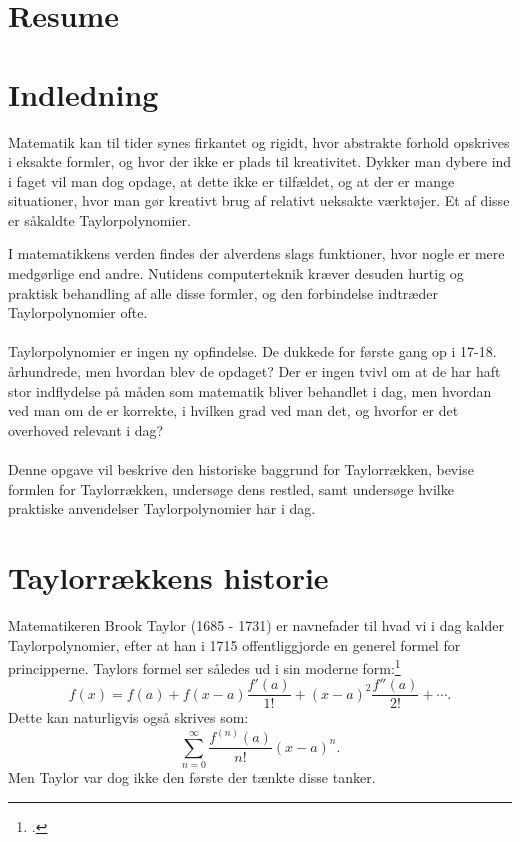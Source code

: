 \documentclass[12pt, a4paper]{article}
\begin{document}
\section*{Resume} %
\blindtext[1-2]
\tableofcontents
\newpage



\section{Indledning} %
Matematik kan til tider synes firkantet og rigidt, hvor abstrakte forhold opskrives i eksakte formler, og hvor der ikke er plads til kreativitet. 
Dykker man dybere ind i faget vil man dog opdage, at dette ikke er tilfældet, og at der er mange situationer, hvor man gør kreativt brug af relativt ueksakte værktøjer. Et af disse er såkaldte Taylorpolynomier.


I matematikkens verden findes der alverdens slags funktioner, hvor nogle er mere medgørlige end andre. Nutidens computerteknik kræver desuden hurtig og praktisk behandling af alle disse formler, og den forbindelse indtræder Taylorpolynomier ofte.\\
\\
Taylorpolynomier er ingen ny opfindelse. De dukkede for første gang op i 17-18. århundrede, men hvordan blev de opdaget? Der er ingen tvivl om at de har haft stor indflydelse på måden som matematik bliver behandlet i dag, men hvordan ved man om de er korrekte, i hvilken grad ved man det, og hvorfor er det overhoved relevant i dag?\\
\\
Denne opgave vil beskrive den historiske baggrund for Taylorrækken, bevise formlen for Taylorrækken, undersøge dens restled, samt undersøge hvilke praktiske anvendelser Taylorpolynomier har i dag.

\section{Taylorrækkens historie} %
Matematikeren Brook Taylor (1685 - 1731) er navnefader til hvad vi i dag kalder Taylorpolynomier, efter at han i 1715 offentliggjorde en generel formel for principperne.
Taylors formel ser således ud i sin moderne form:\footcite[s. 247]{roy_2021}
\begin{equation}
   f(x)=f(a)+f(x-a)\frac{f'(a)}{1!}+(x-a)^2\frac{f''(a)}{2!}+\cdots. 
\end{equation}
Dette kan naturligvis også skrives som:
\begin{equation}
    \sum_{n=0}^{\infty}\frac{f^{(n)}(a)}{n!}(x-a)^n.
\end{equation}
Men Taylor var dog ikke den første der tænkte disse tanker.
\end{document}
